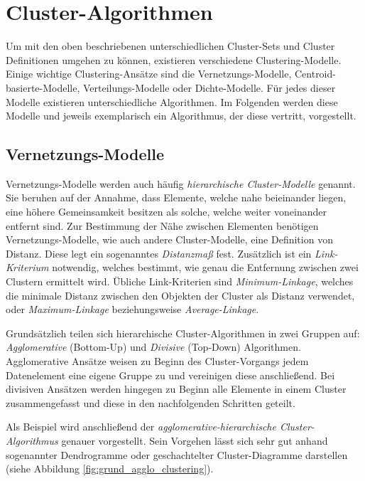 \section{Cluster-Algorithmen}
\label{sec:cluster_algos}

Um mit den oben beschriebenen unterschiedlichen Cluster-Sets und Cluster Definitionen umgehen zu können,
existieren verschiedene Clustering-Modelle.
Einige wichtige Clustering-Ansätze sind die Vernetzungs-Modelle, Centroid-basierte-Modelle, Verteilungs-Modelle
oder Dichte-Modelle. Für jedes dieser Modelle existieren unterschiedliche Algorithmen. Im Folgenden werden
diese Modelle und jeweils exemplarisch ein Algorithmus, der diese vertritt, vorgestellt.

\subsection{Vernetzungs-Modelle}
\label{sec:grund_vernetzungs_clustering}

Vernetzungs-Modelle werden auch häufig \textit{hierarchische Cluster-Modelle} genannt. Sie beruhen auf
der Annahme, dass Elemente, welche nahe beieinander liegen, eine höhere Gemeinsamkeit besitzen als solche,
welche weiter voneinander entfernt sind. Zur Bestimmung der Nähe zwischen Elementen benötigen Vernetzungs-Modelle,
wie auch andere Cluster-Modelle, eine
Definition von Distanz. Diese legt ein sogenanntes \textit{Distanzmaß} fest. Zusätzlich ist ein \textit{Link-Kriterium} notwendig,
welches bestimmt, wie genau die Entfernung zwischen zwei Clustern ermittelt wird. Übliche Link-Kriterien
sind \textit{Minimum-Linkage}, welches die minimale Distanz zwischen den Objekten der Cluster als Distanz verwendet,
oder \textit{Maximum-Linkage} beziehungsweise \textit{Average-Linkage}. \cite[]{Jain1999, GeorgeSeif2018}


Grundsätzlich teilen sich hierarchische Cluster-Algorithmen in zwei Gruppen auf:
\textit{Agglomerative} (Bottom-Up) und \textit{Divisive} (Top-Down) Algorithmen.
Agglomerative Ansätze weisen zu Beginn des Cluster-Vorgangs jedem Datenelement eine eigene Gruppe zu und vereinigen
diese anschließend.
Bei divisiven Ansätzen werden hingegen zu Beginn alle Elemente in einem Cluster zusammengefasst und
diese in den nachfolgenden Schritten geteilt.

Als Beispiel wird anschließend der \textit{agglomerative-hierarchische Cluster-Algorithmus} genauer vorgestellt.
Sein Vorgehen lässt sich sehr gut anhand sogenannter Dendrogramme oder geschachtelter Cluster-Diagramme darstellen
(siehe Abbildung \ref{fig:grund_agglo_clustering}).

